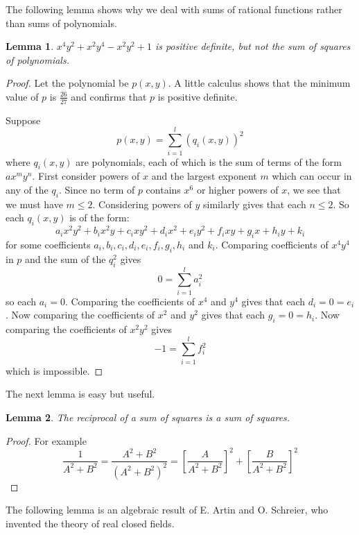 \documentclass[titlepage, oneside]{amsbook}
\theoremstyle{plain}
\newtheorem{lemma}{Lemma}
\theoremstyle{definition}
\theoremstyle{remark}
\begin{document}
The following lemma shows why we deal with sums of rational functions
rather than sums of polynomials.

\begin{lemma}  $x^4 y^2 + x^2 y^4 - x^2 y^2 +1$ is positive definite,
but  not the sum of squares of polynomials.
\end{lemma}

\begin{proof}  Let the polynomial be $p ( x, y)$.  A little calculus
shows that the minimum value of $p$ is $\frac{26}{27}$ and confirms
that $p$ is positive definite.  

Suppose \[ p( x, y) = \sum_{i = 1}^{l} \left( q_i ( x, y ) \right)^2 \]
where $q_i ( x, y)$ are polynomials, each of which is the sum of terms
of the form $a x^m y^n$.  First consider powers of $x$ and the largest
exponent $m$ which can occur in any of the $q_i$.  Since no term of $p$
contains $x^6$ or higher powers of $x$, we see that we must have $m
\leq 2$.  Considering powers of $y$ similarly gives that each $n \leq
2$.  So each $q_i ( x, y) $ is of the form: 
\[ a_i x^2y^2 + b_i x^2 y + c_i x y^2 + d_i x^2 + e_i y^2 + f_i xy +
g_i x + h_i y +k _i \]
for some coefficients $a_i , b_i , c_i , d_i , e_i , f_i , g_i , h_i$
and $k_i$.  Comparing coefficients of $x^4 y^4$ in $p$ and the sum of
the $q_i^2$ gives \[0 = \sum_{i =1}^l a_i^2\] so each $a_i =0$.
Comparing
the
coefficients of $x^4$ and $y^4$ gives that each $d_i = 0 = e_i$.  Now
comparing the coefficients of $x^2$ and $y^2$ gives that each $g_i = 0
= h_i$.  Now comparing the coefficients of $x^2 y^2$ gives \[ -1 =
\sum_{i =1}^l f_i^2 \] which is impossible.

\end{proof}

The next lemma is easy but useful.

\begin{lemma}\label{L:Art}  The reciprocal of a sum of squares is a sum
of squares. 
\end{lemma}
\begin{proof} 
For example \[ \frac{1}{A^2 + B^2} = \frac{A^2 + B^2}{(A^2 + B^2)^2} = 
\left[ \frac{A}{A^2 + B^2 } \right]^2 + \left[ \frac{B}{A^2 + B^2} 
\right]^2 \]


\end{proof}

The following lemma is an algebraic result of E. Artin and O. Schreier,
who invented the theory of real closed fields.
\end{document}
